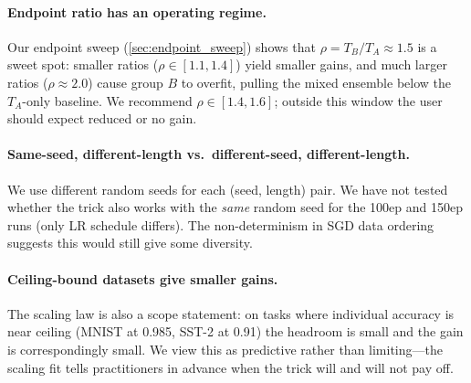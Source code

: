 \paragraph{Endpoint ratio has an operating regime.} Our endpoint sweep
(\cref{sec:endpoint_sweep}) shows that $\rho = T_B/T_A \approx 1.5$ is
a sweet spot: smaller ratios ($\rho \in [1.1, 1.4]$) yield smaller gains,
and much larger ratios ($\rho \approx 2.0$) cause group $B$ to overfit,
pulling the mixed ensemble below the $T_A$-only baseline. We recommend
$\rho \in [1.4, 1.6]$; outside this window the user should expect
reduced or no gain.

\paragraph{Same-seed, different-length vs.\ different-seed, different-length.}
We use different random seeds for each (seed, length) pair. We have not
tested whether the trick also works with the \emph{same} random seed for
the 100ep and 150ep runs (only LR schedule differs). The non-determinism
in SGD data ordering suggests this would still give some diversity.

\paragraph{Ceiling-bound datasets give smaller gains.} The scaling law
is also a scope statement: on tasks where individual accuracy is near
ceiling (MNIST at 0.985, SST-2 at 0.91) the headroom is small and the
gain is correspondingly small. We view this as predictive rather than
limiting---the scaling fit tells practitioners in advance when the
trick will and will not pay off.
